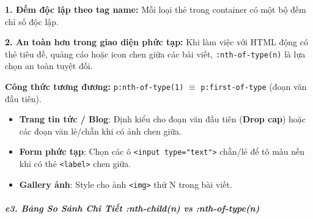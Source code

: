\documentclass[11pt,oneside]{book}
\newcommand{\codeinline}[1]{\textcolor{accentOrange}{\texttt{#1}}}
\newcommand{\term}[1]{\textbf{\textcolor{primaryBlue}{#1}}}
\begin{document}
\begin{warnBox}
\textbf{1. Đếm độc lập theo tag name:} Mỗi loại thẻ trong container có một bộ đếm chỉ số độc lập.
\par\vspace{4pt}
\textbf{2. An toàn hơn trong giao diện phức tạp:} Khi làm việc với HTML động có thẻ tiêu đề, quảng cáo hoặc icon chen giữa các bài viết, \codeinline{:nth-of-type(n)} là lựa chọn an toàn tuyệt đối.
\end{warnBox}

\begin{tipBox}
\textbf{Công thức tương đương:} \codeinline{p:nth-of-type(1)} $\equiv$ \codeinline{p:first-of-type} (đoạn văn đầu tiên).
\end{tipBox}

\begin{conceptBox}
\begin{itemize}[leftmargin=1.5em, itemsep=3pt, parsep=0pt]
    \item \textbf{Trang tin tức / Blog}: Định kiểu cho đoạn văn đầu tiên (\term{Drop cap}) hoặc các đoạn văn lẻ/chẵn khi có ảnh chen giữa.
    \item \textbf{Form phức tạp}: Chọn các ô \codeinline{<input type="text">} chẵn/lẻ để tô màu nền khi có thẻ \codeinline{<label>} chen giữa.
    \item \textbf{Gallery ảnh}: Style cho ảnh \codeinline{<img>} thứ N trong bài viết.
\end{itemize}
\end{conceptBox}


\subparagraph{e3. Bảng So Sánh Chi Tiết :nth-child(n) vs :nth-of-type(n)}
\mbox{}\par\vspace{2pt}
\end{document}
